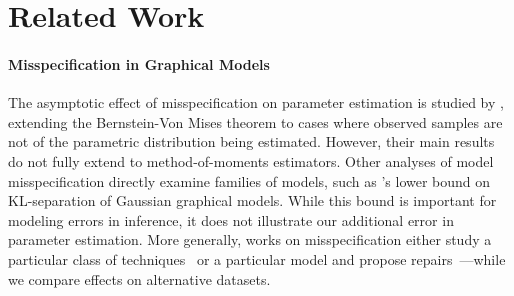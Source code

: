  \section{Related Work}

\paragraph{Misspecification in Graphical Models}
The asymptotic effect of misspecification on parameter estimation is studied by \cite{kleijn2012}, extending the Bernstein-Von Mises theorem to cases where observed samples are not of the parametric distribution being estimated. %
However, their main results do not fully extend to method-of-moments estimators. Other analyses of model misspecification directly examine families of models, such as \cite{JogL15}'s lower bound on KL-separation of Gaussian graphical models. While this bound is important for modeling errors in inference,
it does not illustrate our additional error in parameter estimation. More generally, works on misspecification either study a particular class of techniques~\citep{Blasi13} or a particular model and propose repairs~\citep{Grunwald17}---while we compare effects on alternative datasets.

